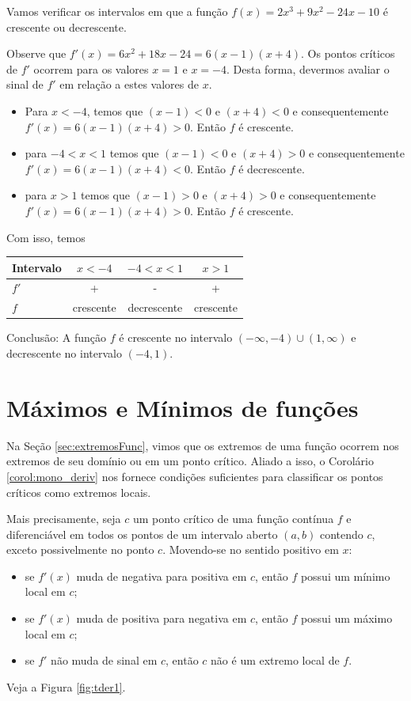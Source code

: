 \cleardoublepage\documentclass[../main.tex]{subfiles}
\begin{document}
\begin{ex}
 Vamos verificar os intervalos em que a função $f ( x ) = 2 x^3 + 9 x^2 - 24x - 10$ é crescente ou decrescente.\\
 \begin{solution}
Observe que $f'(x)=6x^2+18x-24=6(x-1)(x+4)$. Os pontos críticos de $f'$ ocorrem para os valores  $x=1$ e $x=-4 $. Desta forma, devermos avaliar o sinal de $f'$ em relação a estes valores de $x$.
\begin{itemize}
    \item Para $x<-4$, temos que  $(x-1)<0$ e $(x+4)<0$ e consequentemente $f'(x)=6(x-1)(x+4)>0$. Então $f$ é crescente.
    \item para $-4<x<1$ temos que $(x-1)<0$ e $(x+4)>0$ e consequentemente $f'(x)=6(x-1)(x+4)<0$. Então $f$ é decrescente.
    \item para $x>1$ temos que $(x-1)>0$ e $(x+4)>0$ e consequentemente $f'(x)=6(x-1)(x+4)>0$. Então $f$ é crescente.
\end{itemize}
Com isso, temos
  \begin{center}
  \begin{tabular}{lccc}\hline
    Intervalo & $x<-4$ & $-4<x<1$ & $x>1$ \\\hline
    $f'$ & + & - & + \\
    $f$ & crescente & decrescente & crescente\\\hline
  \end{tabular}
\end{center}
Conclusão: A função $f$ é crescente no intervalo $(-\infty,-4)\cup (1,\infty)$ e decrescente no intervalo $(-4,1)$.
 \end{solution}
\end{ex}

\section{Máximos e Mínimos de funções}\hypertarget{MaxMin}{}\label{sec:MaxMin}
Na Seção \ref{sec:extremosFunc}, vimos que os extremos de uma função ocorrem nos extremos de seu domínio ou em um ponto crítico. Aliado a isso, o Corolário \ref{corol:mono_deriv} nos fornece condições suficientes para classificar os pontos críticos como extremos locais.

Mais precisamente, seja $c$ um ponto crítico de uma função contínua $f$ e diferenciável em todos os pontos de um intervalo aberto $(a, b)$ contendo $c$, exceto possivelmente no ponto $c$. Movendo-se no sentido positivo em $x$:
\begin{itemize}
\item se $f'(x)$ muda de negativa para positiva em $c$, então $f$ possui um mínimo local em $c$;
\item se $f'(x)$ muda de positiva para negativa em $c$, então $f$ possui um máximo local em $c$;
\item se $f'$ não muda de sinal em $c$, então $c$ não é um extremo local de $f$.
\end{itemize}
Veja a Figura \ref{fig:tder1}.
\end{document}
